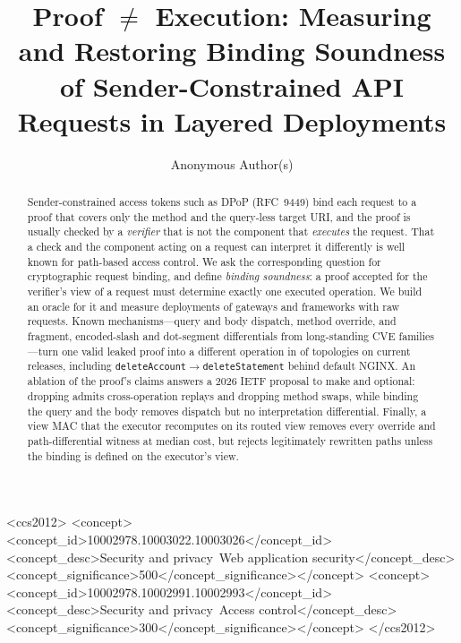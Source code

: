 \documentclass[sigconf,anonymous,review]{acmart}
\begin{document}
\title[Proof $\neq$ Execution: Binding Soundness in Layered Deployments]{Proof $\neq$ Execution: Measuring and Restoring Binding Soundness of
Sender-Constrained API Requests in Layered Deployments}

\author{Anonymous Author(s)}

\begin{abstract}
Sender-constrained access tokens such as DPoP (RFC~9449) bind each request to
a proof that covers only the method and the query-less target URI, and the
proof is usually checked by a \emph{verifier} that is not the component that
\emph{executes} the request. That a check and the component acting on a
request can interpret it differently is well known for path-based access
control. We ask the corresponding question for cryptographic request binding,
and define \emph{binding soundness}: a proof accepted for the verifier's view
of a request must determine exactly one executed operation. We build an
oracle for it and measure \NumTopologiesAll{} deployments of
\NumGateways{} gateways and \NumFrameworks{} frameworks with
\NumCasesAll{} raw requests. Known mechanisms---query and body dispatch,
method override, and fragment, encoded-slash and dot-segment differentials
from long-standing CVE families---turn one valid leaked proof into a
different operation in \NumVulnTopologies{} of \NumTopologies{} topologies
on current releases, including \texttt{deleteAccount}$\to$\texttt{deleteStatement}
behind default NGINX. An ablation of the proof's claims answers a 2026 IETF
proposal to make \htm and \htu optional: dropping \htu admits
\AblOneSwapNoHtu{} cross-operation replays and dropping \htm
\AblOneSwapNoHtm{} method swaps, while binding the query and the body
removes dispatch but no interpretation differential. Finally, a view MAC
that the executor recomputes on its routed view removes every
override and path-differential witness at \DefenceOverheadPfifty{} median
cost, but rejects legitimately rewritten paths unless the binding is
defined on the executor's view.
\end{abstract}

\begin{CCSXML}
<ccs2012>
<concept><concept_id>10002978.10003022.10003026</concept_id>
<concept_desc>Security and privacy~Web application security</concept_desc>
<concept_significance>500</concept_significance></concept>
<concept><concept_id>10002978.10002991.10002993</concept_id>
<concept_desc>Security and privacy~Access control</concept_desc>
<concept_significance>300</concept_significance></concept>
</ccs2012>
\end{CCSXML}
\end{document}
